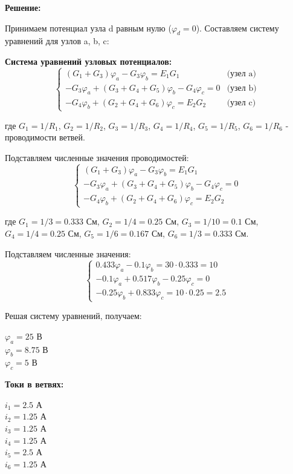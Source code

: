 \textbf{Решение:}

Принимаем потенциал узла d равным нулю ($\varphi_d = 0$). Составляем систему уравнений для узлов a, b, c:

\textbf{Система уравнений узловых потенциалов:}
$$\begin{cases}
(G_1 + G_3)\varphi_a - G_3\varphi_b = E_1 G_1 & \text{(узел a)} \\
-G_3\varphi_a + (G_3 + G_4 + G_5)\varphi_b - G_4\varphi_c = 0 & \text{(узел b)} \\
-G_4\varphi_b + (G_2 + G_4 + G_6)\varphi_c = E_2 G_2 & \text{(узел c)}
\end{cases}$$

где $G_1 = 1/R_1$, $G_2 = 1/R_2$, $G_3 = 1/R_3$, $G_4 = 1/R_4$, $G_5 = 1/R_5$, $G_6 = 1/R_6$ - проводимости ветвей.

Подставляем численные значения проводимостей:
$$\begin{cases}
(G_1 + G_3)\varphi_a - G_3\varphi_b = E_1 G_1 \\
-G_3\varphi_a + (G_3 + G_4 + G_5)\varphi_b - G_4\varphi_c = 0 \\
-G_4\varphi_b + (G_2 + G_4 + G_6)\varphi_c = E_2 G_2
\end{cases}$$

где $G_1 = 1/3 = 0.333$ См, $G_2 = 1/4 = 0.25$ См, $G_3 = 1/10 = 0.1$ См, $G_4 = 1/4 = 0.25$ См, $G_5 = 1/6 = 0.167$ См, $G_6 = 1/3 = 0.333$ См.

Подставляем численные значения:
$$\begin{cases}
0.433\varphi_a - 0.1\varphi_b = 30 \cdot 0.333 = 10 \\
-0.1\varphi_a + 0.517\varphi_b - 0.25\varphi_c = 0 \\
-0.25\varphi_b + 0.833\varphi_c = 10 \cdot 0.25 = 2.5
\end{cases}$$

Решая систему уравнений, получаем:
\begin{flushleft}
$\varphi_a = 25$ В \\
$\varphi_b = 8.75$ В \\
$\varphi_c = 5$ В
\end{flushleft}

\textbf{Токи в ветвях:}
\begin{flushleft}
$i_1 = 2.5$ А \\
$i_2 = 1.25$ А \\
$i_3 = 1.25$ А \\
$i_4 = 1.25$ А \\
$i_5 = 2.5$ А \\
$i_6 = 1.25$ А
\end{flushleft}

